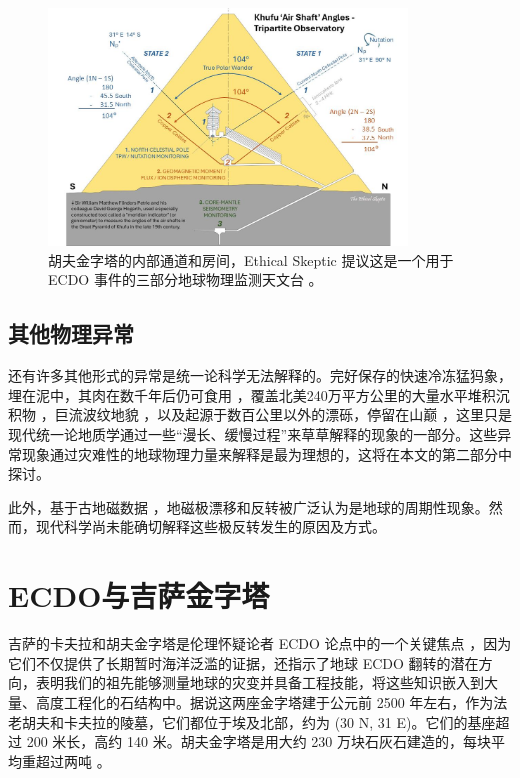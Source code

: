 \documentclass[10pt,twocolumn,letterpaper]{article}
\begin{document}
\begin{figure}[t]
\begin{center}
\includegraphics[width=0.85\textwidth]{shafts.jpg}
\end{center}
   \caption{胡夫金字塔的内部通道和房间，Ethical Skeptic 提议这是一个用于 ECDO 事件的三部分地球物理监测天文台 \cite{28}。}
\label{fig:5}
\end{figure}

\subsection{其他物理异常}

还有许多其他形式的异常是统一论科学无法解释的。完好保存的快速冷冻猛犸象，埋在泥中，其肉在数千年后仍可食用 \cite{17,18,19}，覆盖北美240万平方公里的大量水平堆积沉积物 \cite{21}，巨流波纹地貌 \cite{22}，以及起源于数百公里以外的漂砾，停留在山巅 \cite{23,26}，这里只是现代统一论地质学通过一些“漫长、缓慢过程”来草草解释的现象的一部分。这些异常现象通过灾难性的地球物理力量来解释是最为理想的，这将在本文的第二部分中探讨。

此外，基于古地磁数据 \cite{35,40,41}，地磁极漂移和反转被广泛认为是地球的周期性现象。然而，现代科学尚未能确切解释这些极反转发生的原因及方式。

\section{ECDO与吉萨金字塔}

吉萨的卡夫拉和胡夫金字塔是伦理怀疑论者 ECDO 论点中的一个关键焦点 \cite{27}，因为它们不仅提供了长期暂时海洋泛滥的证据，还指示了地球 ECDO 翻转的潜在方向，表明我们的祖先能够测量地球的灾变并具备工程技能，将这些知识嵌入到大量、高度工程化的石结构中。据说这两座金字塔建于公元前 2500 年左右，作为法老胡夫和卡夫拉的陵墓，它们都位于埃及北部，约为 (30 N, 31 E)。它们的基座超过 200 米长，高约 140 米。胡夫金字塔是用大约 230 万块石灰石建造的，每块平均重超过两吨 \cite{24, 25}。
\end{document}
